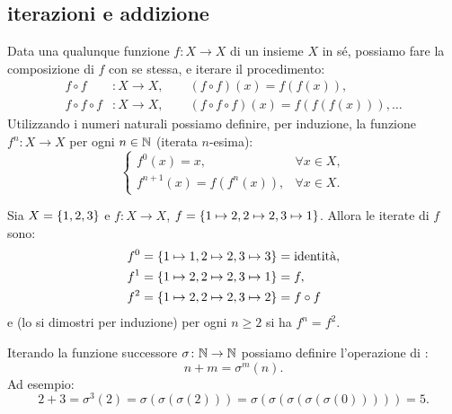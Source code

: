 \subsection{iterazioni e addizione}
%
%
%
%
%
Data una qualunque funzione $f\colon X \to X$ di un insieme $X$ in sé, 
possiamo fare la composizione di $f$ con se stessa, e iterare il procedimento: 
\begin{align*}
  f\circ f &\colon X\to X, 
    \qquad (f\circ f)(x) = f(f(x)),\\ 
  f\circ f \circ f&\colon X\to X,
    \qquad(f\circ f \circ f) (x) = f(f(f(x))), \dots   
\end{align*}
Utilizzando i numeri naturali possiamo definire, per induzione, 
la funzione $f^n\colon X\to X$ per ogni $n\in {\mathbb N}$ 
(iterata $n$-esima):
\begin{equation}
  \label{def:iterata}%
  \begin{cases}
    f^0(x) =  x, &\forall x\in X,\\
    f^{n+1}(x) = f(f^n(x)), &\forall x\in X.
  \end{cases}  
\end{equation}
%
\begin{example}
Sia $X={\left\{ 1,2,3 \right\}}$ e $f\colon X\to X$, $f = {\left\{ 1\mapsto 2, 2 \mapsto 2, 3\mapsto 1 \right\}}$.
Allora le iterate di $f$ sono:
\begin{align*}
  f^0 &= {\left\{ 1\mapsto 1, 2\mapsto 2, 3\mapsto 3 \right\}} = \text{identità}, \\
  f^1 &= {\left\{ 1\mapsto 2, 2 \mapsto 2, 3\mapsto 1 \right\}} = f,\\
  f^2 &= {\left\{ 1\mapsto 2, 2\mapsto 2, 3\mapsto 2 \right\}} = f\circ f
\end{align*}
e (lo si dimostri per induzione) per ogni $n\ge 2$ si ha $f^n = f^2$.
\end{example}
%
%
%

Iterando la funzione successore $\sigma\colon {\mathbb N} \to {\mathbb N}$ possiamo definire 
l'operazione di :
\[
  n + m = \sigma^m(n).  
\]
Ad esempio:
\[
  2 + 3 
  = \sigma^3(2) 
  = \sigma(\sigma(\sigma(2))) 
  = \sigma(\sigma(\sigma(\sigma(\sigma(0))))) = 5.
\]

